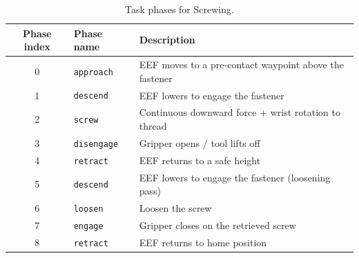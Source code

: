 \begin{table}[htbp]
    \centering
    \caption{Task phases for Screwing.}
    \label{tab:phases_screw}
    \small
    \begin{tabular}{clp{8cm}}
        \toprule
        Phase index & Phase name         & Description                                            \\
        \midrule
        0           & \texttt{approach}  & EEF moves to a pre-contact waypoint above the fastener \\
        1           & \texttt{descend}   & EEF lowers to engage the fastener                      \\
        2           & \texttt{screw}     & Continuous downward force + wrist rotation to thread   \\
        3           & \texttt{disengage} & Gripper opens / tool lifts off                         \\
        4           & \texttt{retract}   & EEF returns to a safe height                           \\
        5           & \texttt{descend}   & EEF lowers to engage the fastener (loosening pass)     \\
        6           & \texttt{loosen}    & Loosen the screw                                       \\
        7           & \texttt{engage}    & Gripper closes on the retrieved screw                  \\
        8           & \texttt{retract}   & EEF returns to home position                           \\
        \bottomrule
    \end{tabular}
\end{table}

